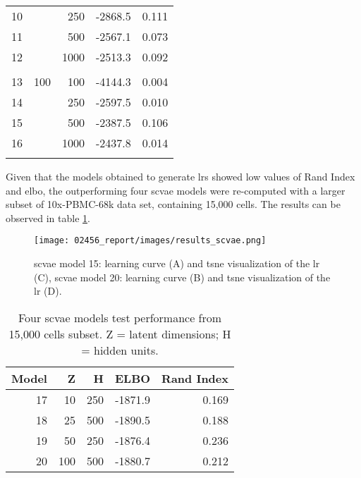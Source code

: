 \documentclass{article}
\begin{document}
\begin{table}[h]
\begin{tabular}{rrrrr}
10    &                                        & 250          & -2868.5 & 0.111      \\ 
11    &                                           & 500          & -2567.1 & 0.073      \\ 
12    &                                           & 1000         & -2513.3 & 0.092      \\ 
   &                                     &          & &    \\ 
13    & 100                                         & 100          & -4144.3 & 0.004      \\ 
14    &                                          & 250          & -2597.5 & 0.010      \\ 
15    &                                          & 500          & -2387.5 & 0.106      \\ 
16    &                                         & 1000         & -2437.8 & 0.014      \\
   &                                     &          & &    \\ \hline
\end{tabular}
\vspace{0.25cm}
\end{table}

\noindent Given that the models obtained to generate \glspl{lr} showed low values of Rand Index and \gls{elbo}, the outperforming four \gls{scvae} models were re-computed with a larger subset of 10x-PBMC-68k data set, containing 15,000 cells. 
The results can be observed in table \ref{tab:17-20_models}.\\

\begin{figure*}[t!]
\centering
    \texttt{[image: 02456\_report/images/results\_scvae.png]}
    \caption{\small{\gls{scvae} model 15: learning curve (A) and \gls{tsne} visualization of the \gls{lr} (C), \gls{scvae} model 20: learning curve (B) and \gls{tsne} visualization of the \gls{lr} (D).}}
    \label{figure:cluster_training}
\end{figure*} 

\begin{table}[h]
\caption{\small{Four \gls{scvae} models test performance from 15,000 cells subset. Z = latent dimensions; H = hidden units.}}
\vspace{0.25cm}
\small
\centering
\begin{tabular}{rrrrr}
\hline
Model & Z & H & ELBO    & Rand Index \\ \hline
17     & 10                                          & 250          & -1871.9 &  0.169    \\ 
18     & 25                                          & 500          & -1890.5 & 0.188      \\ 
19     & 50                                          & 250          & -1876.4 &   0.236   \\ 
20     & 100                                          & 500         & -1880.7 &  0.212    \\ 
 \hline
\end{tabular}
\label{tab:17-20_models}
\end{table}
\end{document}
